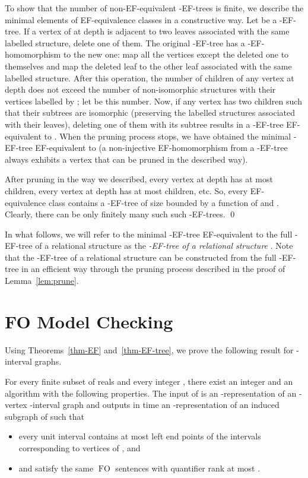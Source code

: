 \documentclass{CSML}
\newcommand{\FO}{\ensuremath{\operatorname{FO}}\xspace}
\theoremstyle{plain}\newtheorem{claim}[thm]{Claim}
\begin{document}
To show that the number of non-EF-equivalent -EF-trees is finite,
we describe the minimal elements of EF-equivalence classes in a constructive way.
Let  be a -EF-tree.
If a vertex of  at depth  is adjacent to two leaves associated with the same labelled structure,
delete one of them.
The original -EF-tree has a -EF-homomorphism to the new one: map all the vertices except the deleted one to themselves and
map the deleted leaf to the other leaf associated with the same labelled structure.
After this operation, the number of children of any vertex at depth  does not exceed the number of non-isomorphic
structures with their vertices labelled by ; let  be this number.
Now, if any vertex has two children such that their subtrees are isomorphic (preserving the labelled structures associated with their leaves),
deleting one of them with its subtree results in a -EF-tree EF-equivalent to .
When the pruning process stops, we have obtained the minimal -EF-tree EF-equivalent to  (a non-injective EF-homomorphism
from a -EF-tree always exhibits a vertex that can be pruned in the described way).

After pruning  in the way we described, every vertex at depth  has at most  children,
every vertex at depth  has at most  children, etc.
So, every EF-equivalence class contains a -EF-tree of size bounded by a function of  and .
Clearly, there can be only finitely many such such -EF-trees.
\qed

In what follows, we will refer to the minimal -EF-tree EF-equivalent to the full -EF-tree of a relational structure  as
the {\em-EF-tree of a relational structure }.
Note that the -EF-tree of a relational structure  can be constructed from the full -EF-tree in an efficient way
through the pruning process described in the proof of Lemma~\ref{lem:prune}.

\section{FO Model Checking}
Using Theorems~\ref{thm-EF} and~\ref{thm-EF-tree},
we prove the following result for -interval graphs.

\begin{thm}
\label{thm-kernel}
For every finite subset  of reals and every integer , there exist an integer  and
an algorithm  with the following properties. The input of  is an -representation
of an -vertex -interval graph  and  outputs in time 
an -representation of an induced subgraph  of  such that
\begin{itemize}
\item every unit interval contains at most  left end points of the intervals
      corresponding to vertices of , and
\item  and  satisfy the same \FO sentences with quantifier rank at most .
\end{itemize}
\end{thm}
\end{document}
